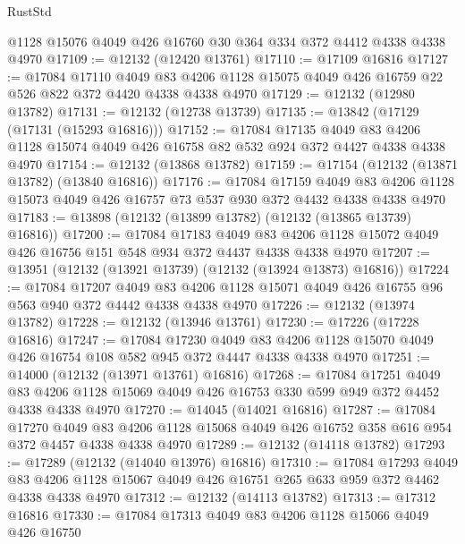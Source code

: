 \begin{lexlean}{RustStd}
\begin{coremodule}
{\begin{coremodule}
{{{{{{{{{{{{{{{{{{{{{{{{{{{{{{{{{{{{{{{{{{{{{{{{{{    @1128
    @15076
    @4049
    @426
    @16760
    @30
    @364
    @334
    @372
    @4412
    @4338
    @4338
    @4970
@17109 := @12132 (@12420 @13761)
@17110 := @17109 @16816
@17127 := @17084
    @17110
    @4049
    @83
    @4206
    @1128
    @15075
    @4049
    @426
    @16759
    @22
    @526
    @822
    @372
    @4420
    @4338
    @4338
    @4970
@17129 := @12132 (@12980 @13782)
@17131 := @12132 (@12738 @13739)
@17135 := @13842 (@17129 (@17131 (@15293 @16816)))
@17152 := @17084
    @17135
    @4049
    @83
    @4206
    @1128
    @15074
    @4049
    @426
    @16758
    @82
    @532
    @924
    @372
    @4427
    @4338
    @4338
    @4970
@17154 := @12132 (@13868 @13782)
@17159 := @17154 (@12132 (@13871 @13782) (@13840 @16816))
@17176 := @17084
    @17159
    @4049
    @83
    @4206
    @1128
    @15073
    @4049
    @426
    @16757
    @73
    @537
    @930
    @372
    @4432
    @4338
    @4338
    @4970
@17183 := @13898 (@12132 (@13899 @13782) (@12132 (@13865 @13739) @16816))
@17200 := @17084
    @17183
    @4049
    @83
    @4206
    @1128
    @15072
    @4049
    @426
    @16756
    @151
    @548
    @934
    @372
    @4437
    @4338
    @4338
    @4970
@17207 := @13951 (@12132 (@13921 @13739) (@12132 (@13924 @13873) @16816))
@17224 := @17084
    @17207
    @4049
    @83
    @4206
    @1128
    @15071
    @4049
    @426
    @16755
    @96
    @563
    @940
    @372
    @4442
    @4338
    @4338
    @4970
@17226 := @12132 (@13974 @13782)
@17228 := @12132 (@13946 @13761)
@17230 := @17226 (@17228 @16816)
@17247 := @17084
    @17230
    @4049
    @83
    @4206
    @1128
    @15070
    @4049
    @426
    @16754
    @108
    @582
    @945
    @372
    @4447
    @4338
    @4338
    @4970
@17251 := @14000 (@12132 (@13971 @13761) @16816)
@17268 := @17084
    @17251
    @4049
    @83
    @4206
    @1128
    @15069
    @4049
    @426
    @16753
    @330
    @599
    @949
    @372
    @4452
    @4338
    @4338
    @4970
@17270 := @14045 (@14021 @16816)
@17287 := @17084
    @17270
    @4049
    @83
    @4206
    @1128
    @15068
    @4049
    @426
    @16752
    @358
    @616
    @954
    @372
    @4457
    @4338
    @4338
    @4970
@17289 := @12132 (@14118 @13782)
@17293 := @17289 (@12132 (@14040 @13976) @16816)
@17310 := @17084
    @17293
    @4049
    @83
    @4206
    @1128
    @15067
    @4049
    @426
    @16751
    @265
    @633
    @959
    @372
    @4462
    @4338
    @4338
    @4970
@17312 := @12132 (@14113 @13782)
@17313 := @17312 @16816
@17330 := @17084
    @17313
    @4049
    @83
    @4206
    @1128
    @15066
    @4049
    @426
    @16750
}}}}}}}}}}}}}}}}}}}}}}}}}}}}}}}}}}}}}}}}}}}}}}}}}}
\end{coremodule}}
\end{coremodule}
\end{lexlean}
